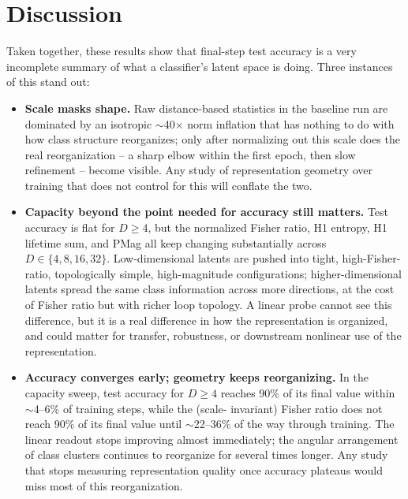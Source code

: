 \documentclass[11pt]{article}
\begin{document}
\section{Discussion}

Taken together, these results show that final-step test accuracy is a very
incomplete summary of what a classifier's latent space is doing. Three
instances of this stand out:

\begin{itemize}
  \item \textbf{Scale masks shape.} Raw distance-based statistics in the
  baseline run are dominated by an isotropic $\sim$40$\times$ norm inflation
  that has nothing to do with how class structure reorganizes; only after
  normalizing out this scale does the real reorganization -- a sharp
  elbow within the first epoch, then slow refinement -- become visible.
  Any study of representation geometry over training that does not control
  for this will conflate the two.

  \item \textbf{Capacity beyond the point needed for accuracy still
  matters.} Test accuracy is flat for $D \ge 4$, but the normalized Fisher
  ratio, H1 entropy, H1 lifetime sum, and PMag all keep changing
  substantially across $D \in \{4,8,16,32\}$. Low-dimensional latents are
  pushed into tight, high-Fisher-ratio, topologically simple, high-magnitude
  configurations; higher-dimensional latents spread the same class
  information across more directions, at the cost of Fisher ratio but with
  richer loop topology. A linear probe cannot see this difference, but it is
  a real difference in how the representation is organized, and could
  matter for transfer, robustness, or downstream nonlinear use of the
  representation.

  \item \textbf{Accuracy converges early; geometry keeps reorganizing.} In
  the capacity sweep, test accuracy for $D\ge4$ reaches 90\% of its
  final value within $\sim$4--6\% of training steps, while the (scale-
  invariant) Fisher ratio does not reach 90\% of its final value until
  $\sim$22--36\% of the way through training. The linear readout stops
  improving almost immediately; the angular arrangement of class clusters
  continues to reorganize for several times longer. Any study that stops
  measuring representation quality once accuracy plateaus would miss most
  of this reorganization.


\end{itemize}
\end{document}
